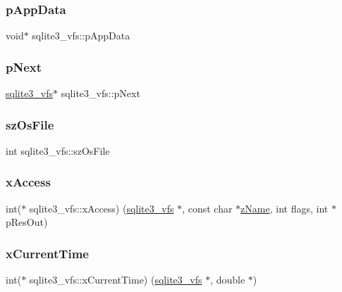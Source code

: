 \subsubsection{\texorpdfstring{pAppData}{pAppData}}
{\footnotesize\ttfamily void$\ast$ sqlite3\+\_\+vfs\+::p\+App\+Data}

\mbox{\label{structsqlite3__vfs_ae795a4417697ecd35163f6cdf0069073}} 
\subsubsection{\texorpdfstring{pNext}{pNext}}
{\footnotesize\ttfamily \mbox{\hyperlink{structsqlite3__vfs}{sqlite3\+\_\+vfs}}$\ast$ sqlite3\+\_\+vfs\+::p\+Next}

\mbox{\label{structsqlite3__vfs_a549399081342d61134b6398562a0a997}} 
\subsubsection{\texorpdfstring{szOsFile}{szOsFile}}
{\footnotesize\ttfamily int sqlite3\+\_\+vfs\+::sz\+Os\+File}

\mbox{\label{structsqlite3__vfs_a3a5cc43f1b8a88747eb77db730ce4f69}} 
\subsubsection{\texorpdfstring{xAccess}{xAccess}}
{\footnotesize\ttfamily int($\ast$ sqlite3\+\_\+vfs\+::x\+Access) (\mbox{\hyperlink{structsqlite3__vfs}{sqlite3\+\_\+vfs}} $\ast$, const char $\ast$\mbox{\hyperlink{structsqlite3__vfs_a0f06a27ac2201ea04c0623ef19e5d73e}{z\+Name}}, int flags, int $\ast$p\+Res\+Out)}

\mbox{\label{structsqlite3__vfs_a925aa81bcf67f2daf50ad59de850ef41}} 
\subsubsection{\texorpdfstring{xCurrentTime}{xCurrentTime}}
{\footnotesize\ttfamily int($\ast$ sqlite3\+\_\+vfs\+::x\+Current\+Time) (\mbox{\hyperlink{structsqlite3__vfs}{sqlite3\+\_\+vfs}} $\ast$, double $\ast$)}

